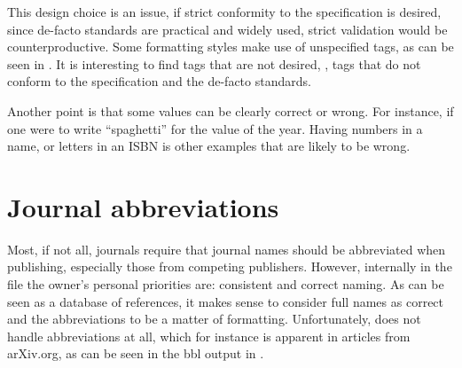 This design choice is an issue, if strict conformity to the
specification is desired, since de-facto standards are practical and
widely used, strict validation would be counterproductive.  Some
formatting styles make use of unspecified tags, as can be seen in
. It is interesting to find tags that are
not desired, \ie, tags that do not conform to the specification and
the de-facto standards.

Another point is that some values can be clearly correct or wrong.
For instance, if one were to write ``spaghetti'' for the value of the
year.  Having numbers in a name, or letters in an ISBN is other
examples that are likely to be wrong.


\section{Journal abbreviations}
\label{sec:problems_abbreviations}

Most, if not all, journals require that journal names should be
abbreviated when publishing, especially those from competing
publishers.  However, internally in the {\bibtex} file the owner's
personal priorities are: consistent and correct naming.  As {\bibtex}
can be seen as a database of references, it makes sense to consider
full names as correct and the abbreviations to be a matter of
formatting.  Unfortunately, {\bibtex} does not handle abbreviations at
all, which for instance is apparent in articles from arXiv.org, as can
be seen in the bbl output in .

